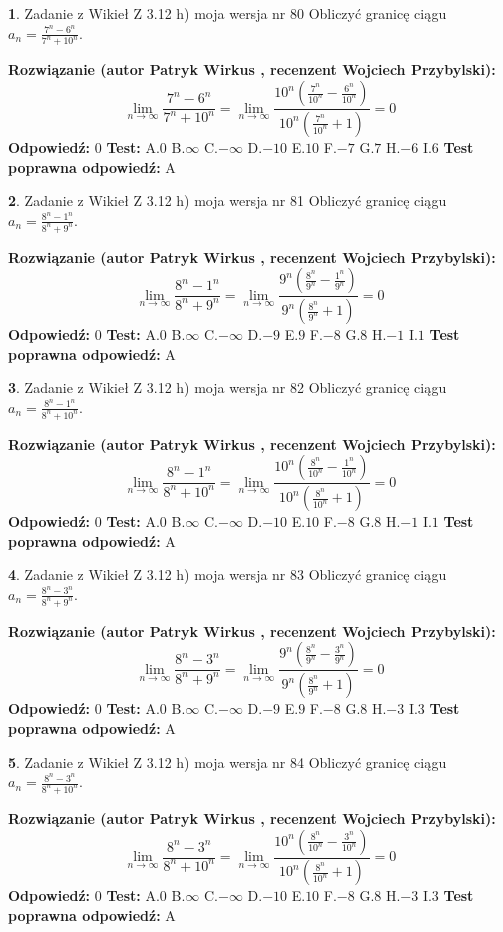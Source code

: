\documentclass[12pt, a4paper]{article}
\theoremstyle{definition} %
\newtheorem{zad}{}
\newcommand{\zadStart}[1]{\begin{zad}#1\newline}
\newcommand{\zadStop}{\end{zad}}
\newcommand{\rozwStart}[2]{\noindent \textbf{Rozwiązanie (autor #1 , recenzent #2): }\newline}
\newcommand{\rozwStop}{\newline}
\newcommand{\odpStart}{\noindent \textbf{Odpowiedź:}\newline}
\newcommand{\odpStop}{\newline}
\newcommand{\testStart}{\noindent \textbf{Test:}\newline}
\newcommand{\testStop}{\newline}
\newcommand{\kluczStart}{\noindent \textbf{Test poprawna odpowiedź:}\newline}
\newcommand{\kluczStop}{\newline}
\begin{document}
\zadStart{Zadanie z Wikieł Z 3.12 h) moja wersja nr 80}
Obliczyć granicę ciągu $a_{n}=\frac{7^{n} - 6^{n}}{7^{n} + 10^{n}}$.
\zadStop
\rozwStart{Patryk Wirkus}{Wojciech Przybylski}
$$\lim\limits_{n\to\infty}\frac{7^{n} - 6^{n}}{7^{n} + 10^{n}} = \lim\limits_{n\to\infty}\frac{10^{n}(\frac{7^{n}}{10^{n}} - \frac{6^{n}}{10^{n}})}{10^{n}(\frac{7^{n}}{10^{n}} + 1)} = 0$$
\rozwStop
\odpStart
$0$
\odpStop
\testStart
A.$0$
B.$\infty$
C.$-\infty$
D.$-10$
E.$10$
F.$-7$
G.$7$
H.$-6$
I.$6$
\testStop
\kluczStart
A
\kluczStop



\zadStart{Zadanie z Wikieł Z 3.12 h) moja wersja nr 81}
Obliczyć granicę ciągu $a_{n}=\frac{8^{n} - 1^{n}}{8^{n} + 9^{n}}$.
\zadStop
\rozwStart{Patryk Wirkus}{Wojciech Przybylski}
$$\lim\limits_{n\to\infty}\frac{8^{n} - 1^{n}}{8^{n} + 9^{n}} = \lim\limits_{n\to\infty}\frac{9^{n}(\frac{8^{n}}{9^{n}} - \frac{1^{n}}{9^{n}})}{9^{n}(\frac{8^{n}}{9^{n}} + 1)} = 0$$
\rozwStop
\odpStart
$0$
\odpStop
\testStart
A.$0$
B.$\infty$
C.$-\infty$
D.$-9$
E.$9$
F.$-8$
G.$8$
H.$-1$
I.$1$
\testStop
\kluczStart
A
\kluczStop



\zadStart{Zadanie z Wikieł Z 3.12 h) moja wersja nr 82}
Obliczyć granicę ciągu $a_{n}=\frac{8^{n} - 1^{n}}{8^{n} + 10^{n}}$.
\zadStop
\rozwStart{Patryk Wirkus}{Wojciech Przybylski}
$$\lim\limits_{n\to\infty}\frac{8^{n} - 1^{n}}{8^{n} + 10^{n}} = \lim\limits_{n\to\infty}\frac{10^{n}(\frac{8^{n}}{10^{n}} - \frac{1^{n}}{10^{n}})}{10^{n}(\frac{8^{n}}{10^{n}} + 1)} = 0$$
\rozwStop
\odpStart
$0$
\odpStop
\testStart
A.$0$
B.$\infty$
C.$-\infty$
D.$-10$
E.$10$
F.$-8$
G.$8$
H.$-1$
I.$1$
\testStop
\kluczStart
A
\kluczStop



\zadStart{Zadanie z Wikieł Z 3.12 h) moja wersja nr 83}
Obliczyć granicę ciągu $a_{n}=\frac{8^{n} - 3^{n}}{8^{n} + 9^{n}}$.
\zadStop
\rozwStart{Patryk Wirkus}{Wojciech Przybylski}
$$\lim\limits_{n\to\infty}\frac{8^{n} - 3^{n}}{8^{n} + 9^{n}} = \lim\limits_{n\to\infty}\frac{9^{n}(\frac{8^{n}}{9^{n}} - \frac{3^{n}}{9^{n}})}{9^{n}(\frac{8^{n}}{9^{n}} + 1)} = 0$$
\rozwStop
\odpStart
$0$
\odpStop
\testStart
A.$0$
B.$\infty$
C.$-\infty$
D.$-9$
E.$9$
F.$-8$
G.$8$
H.$-3$
I.$3$
\testStop
\kluczStart
A
\kluczStop



\zadStart{Zadanie z Wikieł Z 3.12 h) moja wersja nr 84}
Obliczyć granicę ciągu $a_{n}=\frac{8^{n} - 3^{n}}{8^{n} + 10^{n}}$.
\zadStop
\rozwStart{Patryk Wirkus}{Wojciech Przybylski}
$$\lim\limits_{n\to\infty}\frac{8^{n} - 3^{n}}{8^{n} + 10^{n}} = \lim\limits_{n\to\infty}\frac{10^{n}(\frac{8^{n}}{10^{n}} - \frac{3^{n}}{10^{n}})}{10^{n}(\frac{8^{n}}{10^{n}} + 1)} = 0$$
\rozwStop
\odpStart
$0$
\odpStop
\testStart
A.$0$
B.$\infty$
C.$-\infty$
D.$-10$
E.$10$
F.$-8$
G.$8$
H.$-3$
I.$3$
\testStop
\kluczStart
A
\kluczStop
\end{document}
